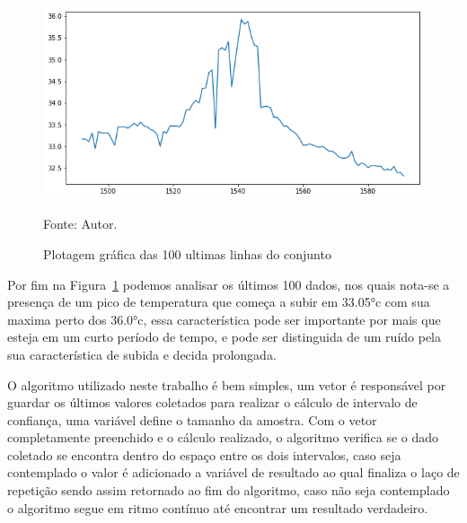 \begin{figure}[H]
	\centering
	\includegraphics[width=15cm]{imagens/sensores/bruto_100_ultimas.png}
	\caption{Plotagem gráfica das 100 ultimas linhas do conjunto}
	Fonte: Autor.
	\label{fig: bruto_100u}
\end{figure}

Por fim na Figura~\ref{fig: bruto_100u} podemos analisar os últimos 100 dados, nos quais nota-se a presença de um pico de temperatura que começa a subir em \ang{33.05}c com sua maxima perto dos \ang{36.0}c, essa característica pode ser importante por mais que esteja em um curto período de tempo, e pode ser distinguida de um ruído pela sua característica de subida e decida prolongada. 

O algoritmo utilizado neste trabalho é bem simples, um vetor é responsável por guardar os últimos valores coletados para realizar o cálculo de intervalo de confiança, uma variável define o tamanho da amostra. Com o vetor completamente preenchido e o cálculo realizado, o algoritmo verifica se o dado coletado se encontra dentro do espaço entre os dois intervalos, caso seja contemplado o valor é adicionado a variável de resultado ao qual finaliza o laço de repetição sendo assim retornado ao fim do algoritmo, caso não seja contemplado o algoritmo segue em ritmo contínuo até encontrar um resultado verdadeiro.


